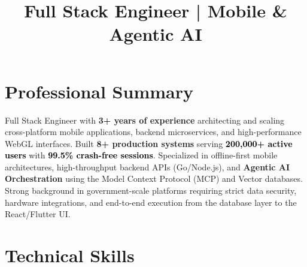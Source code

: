 \documentclass[11pt,a4paper,sans]{moderncv}
\title{Full Stack Engineer | Mobile \& Agentic AI}
\newcommand{\highlight}[1]{\textbf{#1}}
\newcommand{\success}[1]{\textcolor{black}{\textbf{#1}}}
\begin{document}
\makecvtitle
\vspace{-2em} 

\section{Professional Summary}
Full Stack Engineer with \highlight{3+ years of experience} architecting and scaling cross-platform mobile applications, backend microservices, and high-performance WebGL interfaces. Built \highlight{8+ production systems} serving \success{200,000+ active users} with \success{99.5\% crash-free sessions}. Specialized in offline-first mobile architectures, high-throughput backend APIs (Go/Node.js), and \highlight{Agentic AI Orchestration} using the Model Context Protocol (MCP) and Vector databases. Strong background in government-scale platforms requiring strict data security, hardware integrations, and end-to-end execution from the database layer to the React/Flutter UI.

\section{Technical Skills}
\end{document}
